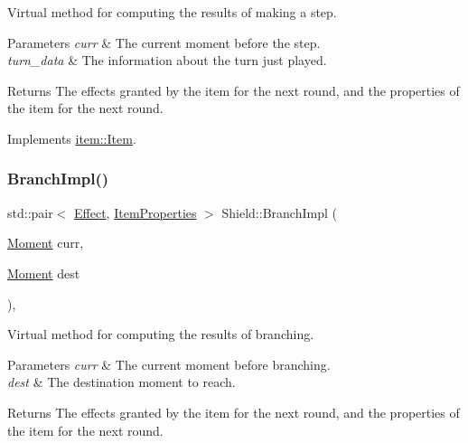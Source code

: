 Virtual method for computing the results of making a step. 


\begin{DoxyParams}{Parameters}
{\em curr} & The current moment before the step. \\
\hline
{\em turn\+\_\+data} & The information about the turn just played. \\
\hline
\end{DoxyParams}
\begin{DoxyReturn}{Returns}
The effects granted by the item for the next round, and the properties of the item for the next round. 
\end{DoxyReturn}


Implements \hyperlink{classitem_1_1_item_a90df61c8a2a20144eb1100af5fb2d464}{item\+::\+Item}.

\mbox{\label{classitem_1_1_shield_a29993d7965fe391d052214cd415eec75}} 
\subsubsection{\texorpdfstring{Branch\+Impl()}{BranchImpl()}}
{\footnotesize\ttfamily std\+::pair$<$ \hyperlink{classitem_1_1_effect}{Effect}, \hyperlink{classitem_1_1_item_properties}{Item\+Properties} $>$ Shield\+::\+Branch\+Impl (\begin{DoxyParamCaption}\item[{\hyperlink{classtimeplane_1_1_moment}{Moment}}]{curr,  }\item[{\hyperlink{classtimeplane_1_1_moment}{Moment}}]{dest }\end{DoxyParamCaption})\hspace{0.3cm}{\ttfamily [protected]}, {\ttfamily [virtual]}}



Virtual method for computing the results of branching. 


\begin{DoxyParams}{Parameters}
{\em curr} & The current moment before branching. \\
\hline
{\em dest} & The destination moment to reach. \\
\hline
\end{DoxyParams}
\begin{DoxyReturn}{Returns}
The effects granted by the item for the next round, and the properties of the item for the next round. 
\end{DoxyReturn}


